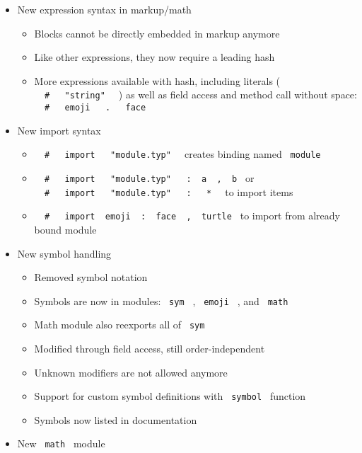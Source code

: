 \begin{itemize}
\tightlist
\item
  New expression syntax in markup/math

  \begin{itemize}
  \tightlist
  \item
    Blocks cannot be directly embedded in markup anymore
  \item
    Like other expressions, they now require a leading hash
  \item
    More expressions available with hash, including literals (
    \texttt{\ }{\texttt{\ \#\ }}\texttt{\ }{\texttt{\ "string"\ }}\texttt{\ }
    ) as well as field access and method call without space:
    \texttt{\ }{\texttt{\ \#\ }}\texttt{\ }{\texttt{\ emoji\ }}\texttt{\ }{\texttt{\ .\ }}\texttt{\ }{\texttt{\ face\ }}\texttt{\ }
  \end{itemize}
\item
  New import syntax

  \begin{itemize}
  \tightlist
  \item
    \texttt{\ }{\texttt{\ \#\ }}\texttt{\ }{\texttt{\ import\ }}\texttt{\ }{\texttt{\ "module.typ"\ }}\texttt{\ }
    creates binding named \texttt{\ module\ }
  \item
    \texttt{\ }{\texttt{\ \#\ }}\texttt{\ }{\texttt{\ import\ }}\texttt{\ }{\texttt{\ "module.typ"\ }}\texttt{\ }{\texttt{\ :\ }}\texttt{\ a\ }{\texttt{\ ,\ }}\texttt{\ b\ }
    or
    \texttt{\ }{\texttt{\ \#\ }}\texttt{\ }{\texttt{\ import\ }}\texttt{\ }{\texttt{\ "module.typ"\ }}\texttt{\ }{\texttt{\ :\ }}\texttt{\ }{\texttt{\ *\ }}\texttt{\ }
    to import items
  \item
    \texttt{\ }{\texttt{\ \#\ }}\texttt{\ }{\texttt{\ import\ }}\texttt{\ emoji\ }{\texttt{\ :\ }}\texttt{\ face\ }{\texttt{\ ,\ }}\texttt{\ turtle\ }
    to import from already bound module
  \end{itemize}
\item
  New symbol handling

  \begin{itemize}
  \tightlist
  \item
    Removed symbol notation
  \item
    Symbols are now in modules: \texttt{\ sym\ } , \texttt{\ emoji\ } ,
    and \texttt{\ math\ }
  \item
    Math module also reexports all of \texttt{\ sym\ }
  \item
    Modified through field access, still order-independent
  \item
    Unknown modifiers are not allowed anymore
  \item
    Support for custom symbol definitions with \texttt{\ symbol\ }
    function
  \item
    Symbols now listed in documentation
  \end{itemize}
\item
  New \texttt{\ math\ } module


\end{itemize}
